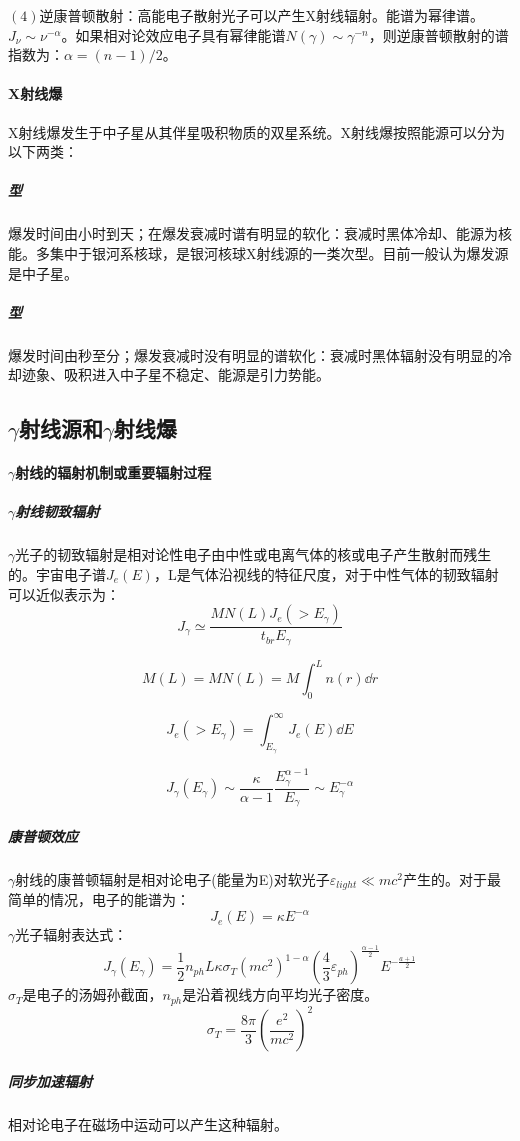 $\left(4\right)$逆康普顿散射：高能电子散射光子可以产生X射线辐射。能谱为幂律谱。$J_{\nu}\sim\nu^{-\alpha}$。如果相对论效应电子具有幂律能谱$N(\gamma)\sim\gamma^{-n}$，则逆康普顿散射的谱指数为：$\alpha=(n-1)/2$。
\paragraph{X射线爆}
X射线爆发生于中子星从其伴星吸积物质的双星系统。X射线爆按照能源可以分为以下两类：
\subparagraph{型}爆发时间由小时到天；在爆发衰减时谱有明显的软化：衰减时黑体冷却、能源为核能。多集中于银河系核球，是银河核球X射线源的一类次型。目前一般认为爆发源是中子星。
\subparagraph{型}爆发时间由秒至分；爆发衰减时没有明显的谱软化：衰减时黑体辐射没有明显的冷却迹象、吸积进入中子星不稳定、能源是引力势能。
\subsection{$\gamma$射线源和$\gamma$射线爆}
\paragraph{$\gamma$射线的辐射机制或重要辐射过程}
\subparagraph{$\gamma$射线韧致辐射}$\gamma$光子的韧致辐射是相对论性电子由中性或电离气体的核或电子产生散射而残生的。宇宙电子谱$J_{e}(E)$，L是气体沿视线的特征尺度，对于中性气体的韧致辐射可以近似表示为：
\begin{equation}
	J_{\gamma}\simeq \frac{MN(L)J_{e}(>E_{\gamma})}{t_{br}E_{\gamma}}
\end{equation}

\begin{equation*}
	M(L)=MN(L)=M\int_{0}^{L}n(r)\dd r
\end{equation*}

\begin{equation*}
	J_{e}(>E_{\gamma})=\int_{E_{\gamma}}^{\infty}J_{e}(E)\dd E
\end{equation*}

\begin{equation}
	J_{\gamma}(E_{\gamma})\sim\frac{\kappa}{\alpha-1}\frac{E_{\gamma}^{\alpha-1}}{E_{\gamma}}\sim E_{\gamma}^{-\alpha}
\end{equation}

\subparagraph{康普顿效应}$\gamma$射线的康普顿辐射是相对论电子(能量为E)对软光子$\varepsilon_{light}\ll mc^2$产生的。对于最简单的情况，电子的能谱为：
\begin{equation}
	J_{e}(E)=\kappa E^{-\alpha}
\end{equation}
$\gamma$光子辐射表达式：
\begin{equation}
	J_{\gamma}(E_{\gamma})=\frac{1}{2}n_{ph}L\kappa \sigma_{T}(mc^2)^{1-\alpha}\left(\frac{4}{3}\varepsilon_{ph}\right)^{\frac{\alpha-1}{2}}E^{-\frac{a+1}{2}}
\end{equation}
$\sigma_{T}$是电子的汤姆孙截面，$n_{ph}$是沿着视线方向平均光子密度。
\begin{equation*}
	\sigma_{T}=\frac{8\pi}{3}\left(\frac{e^2}{mc^2}\right)^2
\end{equation*}
\subparagraph{同步加速辐射}相对论电子在磁场中运动可以产生这种辐射。
